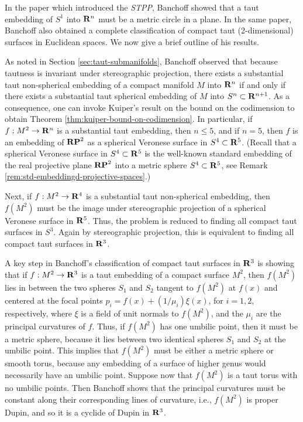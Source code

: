 \documentclass[12pt]{article}
\begin{document}
{In the paper which introduced the {\em STPP},
Banchoff \cite{Ban1} showed that a taut embedding of
$S^1$ into ${\bf R}^n$ must be a metric circle in a plane.
In the same paper,
Banchoff  also obtained a complete classification of
compact taut (2-dimensional) surfaces in Euclidean spaces.
We now give a brief outline of his results.  

As noted in Section \ref{sec:taut-submanifolds}, Banchoff observed that
because tautness is invariant under stereographic projection,
there exists a substantial taut
non-spherical embedding of a compact manifold $M$
into ${\bf R}^n$ if and only if there exists a substantial
taut spherical embedding of $M$ into $S^n \subset {\bf R}^{n+1}$. 
As a consequence, one can invoke
Kuiper's result on the bound on the codimension 
to obtain Theorem \ref{thm:kuiper-bound-on-codimension}.  In particular,
if $f:M^2 \rightarrow {\bf R}^n$ is a substantial taut embedding, then
$n \leq 5$, and if $n=5$, then $f$ is an embedding of ${\bf RP}^2$ as 
a spherical Veronese surface in $S^4 \subset {\bf R}^5$. 
(Recall that a spherical Veronese surface in $S^4 \subset {\bf R}^5$ is the well-known 
standard embedding of the real projective plane
${\bf RP}^2$ into a metric sphere $S^4 \subset {\bf R}^5$, see Remark \ref{rem:std-embeddingd-projective-spaces}.) 





Next, if 
$f:M^2 \rightarrow {\bf R}^4$ is a substantial taut non-spherical embedding, then
$f(M^2)$ must be the image under stereographic projection of
a spherical Veronese surface in ${\bf R}^5$.  Thus, the problem is
reduced to finding all compact taut surfaces in $S^3$.  Again by
stereographic projection, this is equivalent to finding all
compact taut surfaces in ${\bf R}^3$.

A key step in Banchoff's classification of compact taut surfaces
in ${\bf R}^3$ is showing that if $f:M^2 \rightarrow {\bf R}^3$
is a taut embedding of a compact surface $M^2$, then 
$f(M^2)$ lies in between the two spheres $S_1$ and $S_2$
tangent to $f(M^2)$ at $f(x)$ and centered at the focal
points $p_i = f(x) + (1/\mu_i)\xi(x)$, for $i=1,2$, respectively,
where $\xi$ is a field of unit normals to $f(M^2)$, and
the $\mu_i$ are the principal curvatures of $f$.  Thus,
if $f(M^2)$ has one umbilic point, then it must be a metric
sphere, because it lies between two identical spheres
$S_1$ and $S_2$ at the umbilic point.  This implies that
$f(M^2)$ must be either a metric sphere or smooth torus, because
any embedding of a surface of higher genus would necessarily have an
umbilic point.  Suppose now that $f(M^2)$ is a taut torus with no
umbilic points.  Then Banchoff shows that the principal curvatures must
be constant along their corresponding lines of curvature, i.e.,
$f(M^2)$ is proper
Dupin, and so it is a cyclide of Dupin in ${\bf R}^3$. 
 
}
\end{document}
